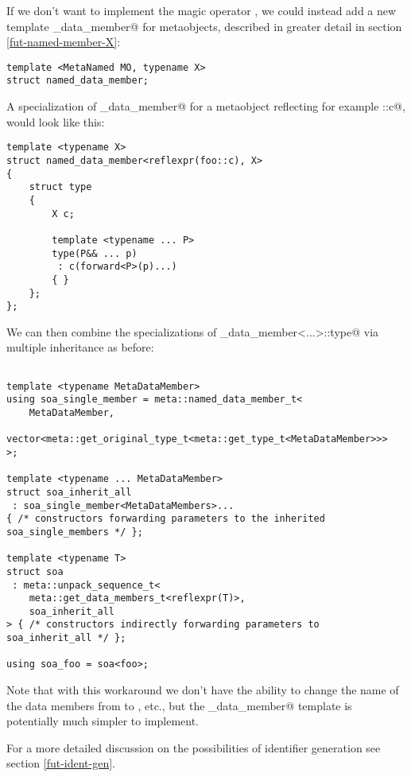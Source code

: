If we don't want to implement the magic operator \verb@identifier@,
we could instead add a new template \verb@named_data_member@
for  metaobjects, described in greater detail in section
\ref{fut-named-member-X}:

\begin{verbatim}
template <MetaNamed MO, typename X>
struct named_data_member;
\end{verbatim}

A specialization of \verb@named_data_member@ for a metaobject reflecting
for example \verb@foo::c@, would look like this:

\begin{verbatim}
template <typename X>
struct named_data_member<reflexpr(foo::c), X>
{
	struct type
	{
		X c;

		template <typename ... P>
		type(P&& ... p)
		 : c(forward<P>(p)...) 
		{ }
	};
};
\end{verbatim}

We can then combine the specializations of \verb@named_data_member<...>::type@
via multiple inheritance as before:

\begin{verbatim}

template <typename MetaDataMember>
using soa_single_member = meta::named_data_member_t<
	MetaDataMember,
	vector<meta::get_original_type_t<meta::get_type_t<MetaDataMember>>>
>;

template <typename ... MetaDataMember>
struct soa_inherit_all
 : soa_single_member<MetaDataMembers>...
{ /* constructors forwarding parameters to the inherited soa_single_members */ };

template <typename T>
struct soa
 : meta::unpack_sequence_t<
	meta::get_data_members_t<reflexpr(T)>,
	soa_inherit_all
> { /* constructors indirectly forwarding parameters to soa_inherit_all */ };

using soa_foo = soa<foo>;
\end{verbatim}

Note that with this workaround we don't have the ability to change the name
of the data members from \verb@c@ to \verb@cs@, etc., but the \verb@named_data_member@
template is potentially much simpler to implement.

For a more detailed discussion on the possibilities of identifier generation
see section \ref{fut-ident-gen}.
